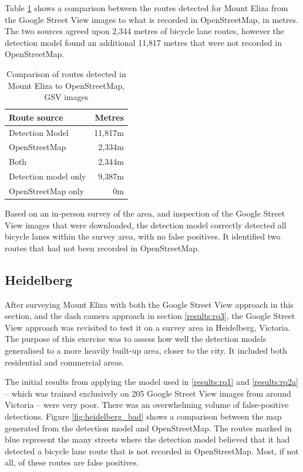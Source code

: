 \documentclass[11pt,twoside]{report}
\begin{document}
Table \ref{table_metres_rq2_me} shows a comparison between the routes detected for Mount Eliza from the Google Street View images to what is recorded in OpenStreetMap, in metres.  The two sources agreed upon 2,344 metres of bicycle lane routes, however the detection model found an additional 11,817 metres that were not recorded in OpenStreetMap.

\begin{table}[h]
\centering
\begin{tabular}{|l|r||}
\hline
\textbf{Route source} & \textbf{Metres} \\
\hline
Detection Model & 11,817m \\
OpenStreetMap & 2,334m \\
Both & 2,344m \\
Detection model only & 9,387m \\
OpenStreetMap only & 0m \\
\hline
\end{tabular}
\caption{Comparison of routes detected in Mount Eliza to OpenStreetMap, GSV images}
\label{table_metres_rq2_me}
\end{table}

Based on an in-person survey of the area, and inspection of the Google Street View images that were downloaded, the detection model correctly detected all bicycle lanes within the survey area, with no false positives.  It identified two routes that had not been recorded in OpenStreetMap.
 

\subsection{Heidelberg}

After surveying Mount Eliza with both the Google Street View approach in this section, and the dash camera approach in section \ref{results:rq3}, the Google Street View approach was revisited to test it on a survey area in Heidelberg, Victoria.  The purpose of this exercise was to assess how well the detection models generalised to a more heavily built-up area, closer to the city.  It included both residential and commercial areas.

The initial results from applying the model used in \ref{results:rq1} and \ref{results:rq2a} -- which was trained exclusively on 205 Google Street View images from around Victoria -- were very poor.  There was an overwhelming volume of false-positive detections.  Figure \ref{fig:heidelberg_bad} shows a comparison between the map generated from the detection model and OpenStreetMap.  The routes marked in blue represent the many streets where the detection model believed that it had detected a bicycle lane route that is not recorded in OpenStreetMap.  Most, if not all, of these routes are false positives.
\end{document}
